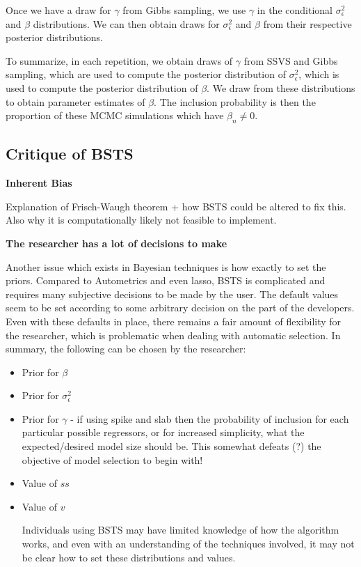 \documentclass[11pt, oneside]{book}   	%
\begin{document}
Once we have a draw for $\gamma$ from Gibbs sampling, we use $\gamma$ in the conditional $\sigma_{\epsilon}^{2}$ and $\beta$ distributions. We can then obtain draws for $\sigma_{\epsilon}^{2}$ and $\beta$ from their respective posterior distributions. 

To summarize, in each repetition, we obtain draws of $\gamma$ from SSVS and Gibbs sampling, which are used to compute the posterior distribution of $\sigma_{\epsilon}^{2}$, which is used to compute the posterior distribution of $\beta$. We draw from these distributions to obtain parameter estimates of $\beta$. The inclusion probability is then the proportion of these MCMC simulations which have $\beta_{n} \neq 0$. 

\subsection {Critique of BSTS}

\textbf{Inherent Bias}

Explanation of Frisch-Waugh theorem + how BSTS could be altered to fix this. Also why it is computationally likely not feasible to implement. 

\textbf {The researcher has a lot of decisions to make}

Another issue which exists in Bayesian techniques is how exactly to set the priors. Compared to Autometrics and even lasso, BSTS is complicated and requires many subjective decisions to be made by the user. The default values seem to be set according to some arbitrary decision on the part of the developers. Even with these defaults in place, there remains a fair amount of flexibility for the researcher, which is problematic when dealing with automatic selection. In summary, the following can be chosen by the researcher:

\begin {itemize}

\item Prior for $\beta$
\item Prior for $\sigma_{\epsilon}^{2}$
\item Prior for $\gamma$ - if using spike and slab then the probability of inclusion for each particular possible regressors, or for increased simplicity, what the expected/desired model size should be. This somewhat defeats (?) the objective of model selection to begin with!
\item Value of $ss$
\item Value of $v$

Individuals using BSTS may have limited knowledge of how the algorithm works, and even with an understanding of the techniques involved, it may not be clear how to set these distributions and values. 


\end {itemize}
\end{document}
